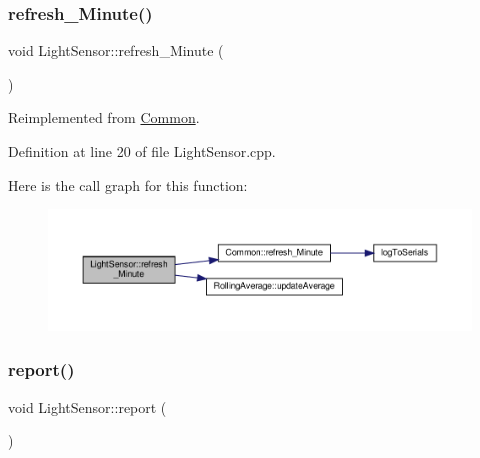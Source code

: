 \mbox{\label{class_light_sensor_aa6c29591860ab05672a183bc32fce6f4}} 
\subsubsection{\texorpdfstring{refresh\+\_\+\+Minute()}{refresh\_Minute()}\hspace{0.1cm}{\footnotesize\ttfamily [2/2]}}
{\footnotesize\ttfamily void Light\+Sensor\+::refresh\+\_\+\+Minute (\begin{DoxyParamCaption}{ }\end{DoxyParamCaption})\hspace{0.3cm}{\ttfamily [virtual]}}



Reimplemented from \hyperlink{class_common_a14e4462a94bd118028ce1d487ca0292c}{Common}.



Definition at line 20 of file Light\+Sensor.\+cpp.

Here is the call graph for this function\+:
\nopagebreak
\begin{figure}[H]
\begin{center}
\leavevmode
\includegraphics[width=350pt]{class_light_sensor_aa6c29591860ab05672a183bc32fce6f4_cgraph}
\end{center}
\end{figure}
\mbox{\label{class_light_sensor_a08ffec2f2bbb09966a8e37bf1f9887f9}} 
\subsubsection{\texorpdfstring{report()}{report()}\hspace{0.1cm}{\footnotesize\ttfamily [1/2]}}
{\footnotesize\ttfamily void Light\+Sensor\+::report (\begin{DoxyParamCaption}{ }\end{DoxyParamCaption})\hspace{0.3cm}{\ttfamily [virtual]}}



